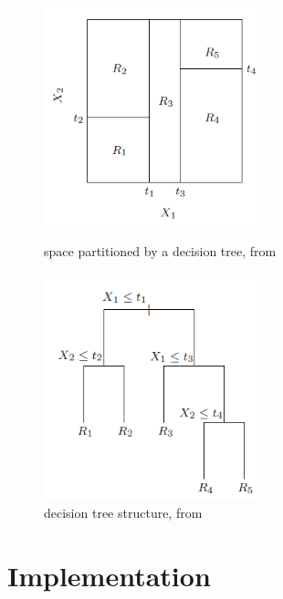 \documentclass[12pt]{article}
\begin{document}

\begin{figure}[h!]
\centering
\begin{minipage}{0.45\textwidth}
\centering
\includegraphics[width=2.5in]{partition}
\caption{space partitioned by a decision tree, from \cite{HTF}}
\end{minipage}\hfill
\begin{minipage}{0.45\textwidth}
\centering
\includegraphics[width=2.5in]{dectree}
\caption{decision tree structure, from \cite{HTF}}
\end{minipage}
\end{figure}

\section{Implementation}
\end{document}
